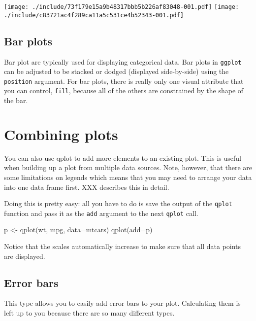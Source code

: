 \texttt{[image: ./include/73f179e15a9b48317bbb5b226af83048-001.pdf]}
\texttt{[image: ./include/c83721ac4f289ca11a5c531ce4b52343-001.pdf]}

\subsection{Bar plots}\label{sub:bar_plots}

Bar plot are typically used for displaying categorical data.  Bar plots in {\tt ggplot} can be adjusted to be stacked or dodged (displayed side-by-side) using the {\tt position} argument.  For bar plots, there is really only one visual attribute that you can control, {\tt fill}, because all of the others are constrained by the shape of the bar.	


\section{Combining plots}\label{sec:combining_plots}

You can also use qplot to add more elements to an existing plot.  This is useful when building up a plot from multiple data sources.  Note, however, that there are some limitations on legends which means that you may need to arrange your data into one data frame first.  XXX describes this in detail.

Doing this is pretty easy: all you have to do is save the output of the {\tt qplot} function and pass it as the {\tt add} argument to the next {\tt qplot} call.

\begin{altt}
p <- qplot(wt, mpg, data=mtcars)
qplot(add=p)	
\end{altt}

Notice that the scales automatically increase to make sure that all data points are displayed.

\subsection{Error bars}\label{sub:error_bars}

This type allows you to easily add error bars to your plot.  Calculating them is left up to you because there are so many different types. 

